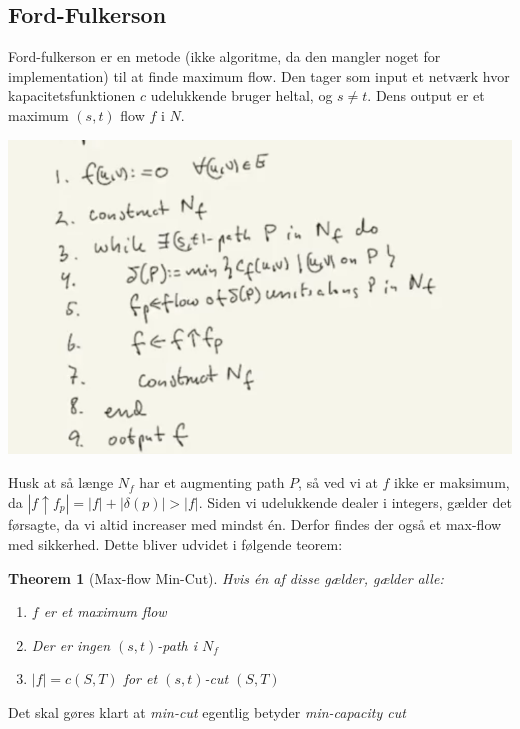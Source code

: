\documentclass[11pt]{article}
\newtheorem{theorem}{Theorem}
\theoremstyle{definition}
\theoremstyle{remark}
\begin{document}
\subsection{Ford-Fulkerson}
\label{subsec:fordfulkerson}

Ford-fulkerson er en metode (ikke algoritme, da den mangler noget for implementation) til at finde maximum flow. Den tager som input et netværk hvor kapacitetsfunktionen $c$ udelukkende bruger heltal, og $s \neq t$. Dens output er et maximum $(s,t)$ flow $f$ i $N$.

\begin{center}
\includegraphics[scale=0.5]{ff.png}
\end{center}

Husk at så længe $N_{f}$ har et augmenting path $P$, så ved vi at $f$ ikke er maksimum, da $|f \uparrow f_{p}| = |f| + |\delta(p)| > |f|$.
Siden vi udelukkende dealer i integers, gælder det førsagte, da vi altid increaser med mindst én. Derfor findes der også et max-flow med sikkerhed. Dette bliver udvidet i følgende teorem:

\begin{theorem}[Max-flow Min-Cut]
  Hvis én af disse gælder, gælder alle:
  \begin{enumerate}
  \item[(1)]\label{item:1} $f$ er et maximum flow
  \item[(2)]\label{item:2} Der er ingen $(s,t)$-path i $N_{f}$
  \item[(3)]\label{item:3}  $|f| = c(S,T)$ for et $(s,t)$-cut $(S,T)$
  \end{enumerate}
\end{theorem}

Det skal gøres klart at \textit{min-cut} egentlig betyder \textit{min-capacity cut}
\end{document}
